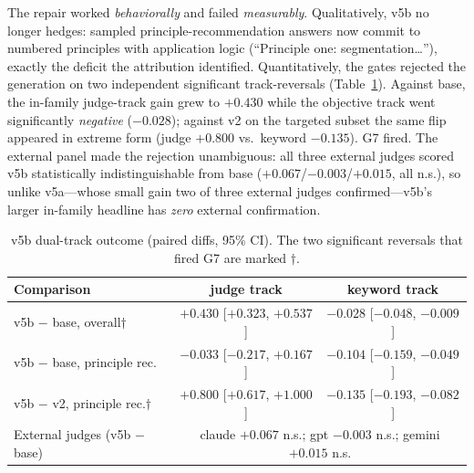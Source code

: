 \documentclass[11pt]{article}
\begin{document}
The repair worked \emph{behaviorally} and failed \emph{measurably}.
Qualitatively, v5b no longer hedges: sampled principle-recommendation
answers now commit to numbered principles with application logic
(``Principle one: segmentation\ldots''), exactly the deficit the
attribution identified. Quantitatively, the gates rejected the
generation on two independent significant track-reversals
(Table~\ref{tab:v5b}). Against base, the in-family judge-track gain
grew to $+0.430$ while the objective track went significantly
\emph{negative} ($-0.028$); against v2 on the targeted subset the same
flip appeared in extreme form (judge $+0.800$ vs.\ keyword $-0.135$).
G7 fired. The external panel made the rejection unambiguous: all three
external judges scored v5b statistically indistinguishable from base
($+0.067$/$-0.003$/$+0.015$, all n.s.), so unlike v5a---whose small
gain two of three external judges confirmed---v5b's larger in-family
headline has \emph{zero} external confirmation.

\begin{table}[t]
\centering
\small
\caption{v5b dual-track outcome (paired diffs, 95\% CI). The two
significant reversals that fired G7 are marked $\dagger$.}
\label{tab:v5b}
\begin{tabular}{@{}lcc@{}}
\toprule
Comparison & judge track & keyword track \\
\midrule
v5b $-$ base, overall$\dagger$ & $+0.430$ [$+0.323$, $+0.537$] &
  $-0.028$ [$-0.048$, $-0.009$] \\
v5b $-$ base, principle rec.\ & $-0.033$ [$-0.217$, $+0.167$] &
  $-0.104$ [$-0.159$, $-0.049$] \\
v5b $-$ v2, principle rec.$\dagger$ & $+0.800$ [$+0.617$, $+1.000$] &
  $-0.135$ [$-0.193$, $-0.082$] \\
\midrule
External judges (v5b $-$ base) & \multicolumn{2}{c}{claude $+0.067$ n.s.;
  gpt $-0.003$ n.s.; gemini $+0.015$ n.s.} \\
\bottomrule
\end{tabular}
\end{table}
\end{document}
